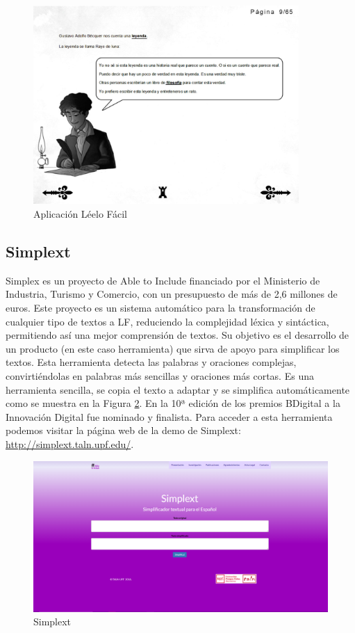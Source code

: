 \begin{figure}[h]
	\centering
	\includegraphics[width=0.9\textwidth]{Imagenes/ProyectosMateriales/leeloFacil}
	\caption{Aplicación Léelo Fácil}
	\label{fig:leeloFacil}
\end{figure} 

\subsection{Simplext }

Simplex \citep{PLN1000} es un proyecto de Able to Include financiado por el Ministerio de Industria, Turismo y Comercio, con un presupuesto de más de 2,6 millones de euros. Este proyecto es un sistema automático para la transformación de cualquier tipo de textos a LF, reduciendo la complejidad léxica y sintáctica, permitiendo así una mejor comprensión de textos. Su objetivo es el desarrollo de un producto (en este caso herramienta) que sirva de apoyo para simplificar los textos. Esta herramienta detecta las palabras y oraciones complejas, convirtiéndolas en palabras más sencillas y oraciones más cortas. Es una herramienta sencilla, se copia el texto a adaptar y se simplifica automáticamente como se muestra en la Figura \ref{fig:simplext}. En la 10ª edición de los premios BDigital a la Innovación Digital fue nominado y finalista.
Para acceder a esta herramienta podemos visitar la página web de la demo de Simplext: \url{http://simplext.taln.upf.edu/}.


\begin{figure}[h]
	\centering
	\includegraphics[width=1.0\textwidth]{Imagenes/ProyectosMateriales/simplext}
	\caption{Simplext}
	\label{fig:simplext}
\end{figure} 

